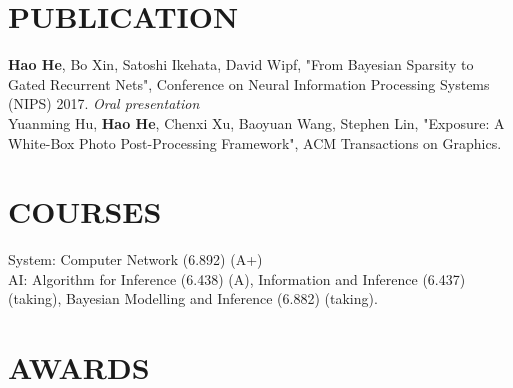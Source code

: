 \documentclass[margin]{res}
\newcommand{\Bullet}[1]{{\raisebox{0.25ex}{\tiny$\bullet$\ }}{#1}\\}
\begin{document}
\begin{resume}
\section{PUBLICATION}
\Bullet{\textbf{Hao He}, Bo Xin, Satoshi Ikehata, David Wipf, "From Bayesian Sparsity to Gated Recurrent Nets",  Conference on Neural Information Processing
Systems (NIPS) 2017. \emph{Oral presentation}}
\Bullet{Yuanming Hu, \textbf{Hao He}, Chenxi Xu, Baoyuan Wang, Stephen Lin, "Exposure: A White-Box Photo Post-Processing Framework", ACM Transactions on Graphics.}
\vspace{-5mm}

\section{COURSES}
\Bullet{System: Computer Network (6.892) (A+)}
\Bullet{AI: Algorithm for Inference (6.438) (A), Information and Inference (6.437) (taking), Bayesian Modelling and Inference (6.882) (taking).}
\vspace{-5mm}

\section{AWARDS}
\Bullet{}
\Bullet{}


\end{resume}
\end{document}
